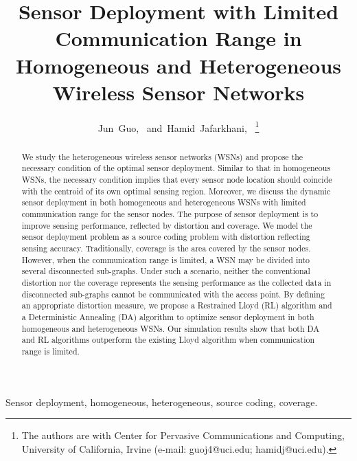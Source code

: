 \documentclass[journal,draftcls,onecolumn,12pt,twoside, narroweqnarray]{IEEEtran}
\begin{document}
\title{Sensor Deployment with Limited Communication Range in Homogeneous and Heterogeneous Wireless Sensor Networks }
\author{Jun~Guo,~
        and~Hamid~Jafarkhani,~
\thanks{The authors are with Center for Pervasive Communications and Computing, University of California, Irvine
(e-mail: guoj4@uci.edu; hamidj@uci.edu).}}

















\maketitle
\begin{abstract}
We study the heterogeneous wireless sensor networks (WSNs) and propose the necessary condition of the optimal sensor deployment. Similar to that in homogeneous WSNs, the necessary condition implies that every sensor node location should coincide with the centroid of its own optimal sensing region. Moreover, we discuss the dynamic sensor deployment in both homogeneous and heterogeneous WSNs with limited communication range for the sensor nodes. The purpose of sensor deployment is to improve sensing performance, reflected by distortion and coverage. We model the sensor deployment problem as a source coding problem with distortion reflecting sensing accuracy. Traditionally, coverage is the area covered by the sensor nodes. However, when the communication range is limited, a WSN may be divided into several disconnected sub-graphs. Under such a scenario, neither the conventional distortion nor the coverage represents the sensing performance as the collected data in disconnected sub-graphs cannot be communicated with the access point. By defining an appropriate distortion measure, we propose a Restrained Lloyd (RL) algorithm and a Deterministic Annealing (DA) algorithm to optimize sensor deployment in both homogeneous and heterogeneous WSNs. Our simulation results show that both DA and RL algorithms outperform the existing Lloyd algorithm when communication range is limited.
\end{abstract}

\begin{IEEEkeywords}
Sensor deployment, homogeneous, heterogeneous, source coding, coverage.
\end{IEEEkeywords}
\end{document}
